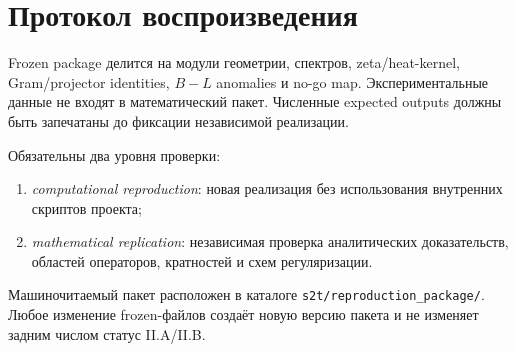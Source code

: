 \section{Протокол воспроизведения}

Frozen package делится на модули геометрии, спектров, zeta/heat-kernel,
Gram/projector identities, \(B-L\) anomalies и no-go map. Экспериментальные
данные не входят в математический пакет. Численные expected outputs должны
быть запечатаны до фиксации независимой реализации.

Обязательны два уровня проверки:
\begin{enumerate}
 \item \emph{computational reproduction}: новая реализация без использования
 внутренних скриптов проекта;
 \item \emph{mathematical replication}: независимая проверка аналитических
 доказательств, областей операторов, кратностей и схем регуляризации.
\end{enumerate}

Машиночитаемый пакет расположен в каталоге
\texttt{s2t/reproduction\_package/}. Любое изменение frozen-файлов создаёт новую
версию пакета и не изменяет задним числом статус II.A/II.B.